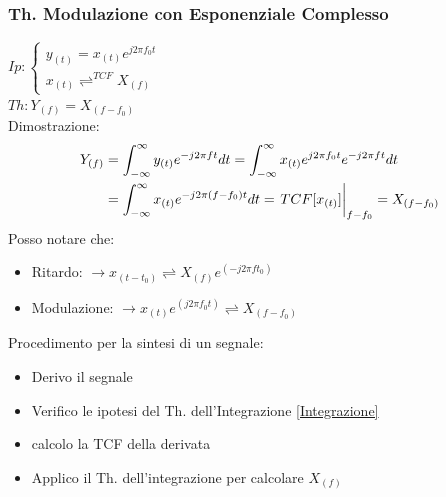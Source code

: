         \subsubsection{Th. Modulazione con Esponenziale Complesso}\label{Modulazione con Esponenziale Complesso}
            $Ip: \begin{cases}
                y_{(t)}= x_{(t)}e^{j2\pi f_0t}\\        
                x_{(t)}\rightleftharpoons^{TCF} X_{(f)}
                \end{cases}$\\
            $Th: Y_{(f)} = X_{(f-f_0)} $ \\
            Dimostrazione: 
            \begin{align}
                Y_{(f)} & = \int_{-\infty}^{\infty} y_{(t)} e^{-j2\pi ft} dt = \int_{-\infty}^{\infty} x_{(t)}e^{j2\pi f_0t} e^{-j2\pi ft} dt \nonumber \\
                & =\int_{-\infty}^{\infty} x_{(t)} e^{-j2\pi (f-f_0)t} dt = \eval{TCF[x_{(t)}]}_{f-f_0} = X_{(f-f_0)} \nonumber
            \end{align}
            Posso notare che:
            \begin{itemize}
                \item Ritardo: $\rightarrow x_{(t-t_0)} \rightleftharpoons X_{(f)} e^{(-j2\pi ft_0)}$
                \item Modulazione: $\rightarrow x_{(t)}e^{(j2\pi f_0t)} \rightleftharpoons X_{(f-f_0)}$
            \end{itemize}
            Procedimento per la sintesi di un segnale:
            \begin{itemize}
                \item Derivo il segnale
                \item Verifico le ipotesi del Th. dell'Integrazione \ref{Integrazione}
                \item calcolo la TCF della derivata
                \item Applico il Th. dell'integrazione per calcolare $X_{(f)}$
            \end{itemize}